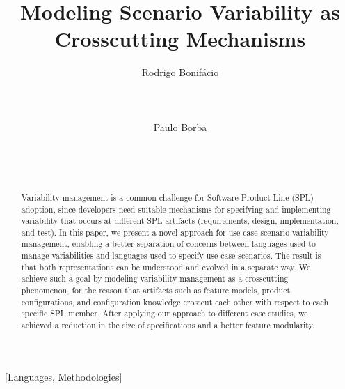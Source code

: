 \documentclass{acm_proc_article-sp}
\begin{document}
\lstset{language=Haskell, numbers=left,
numberstyle=\tiny,numbersep=5pt,basicstyle=\scriptsize,aboveskip=20pt}

\title{Modeling Scenario Variability as Crosscutting Mechanisms}



\author{
\alignauthor
Rodrigo Bonif\'{a}cio\\
       \\
       \\
       \\
\alignauthor
Paulo Borba\\
       \\
       \\
       \\
}

\maketitle

\begin{abstract}
Variability management is a common challenge for Software Product
Line (SPL) adoption, since developers need suitable
mechanisms for specifying and implementing variability
that occurs at different SPL artifacts (requirements, design,
implementation, and test). In this paper, we present a novel approach for
use case scenario variability management, enabling a better
separation of concerns between languages used to manage
variabilities and languages used to specify use case scenarios. The
result is that both representations can be understood and evolved in
a separate way. We achieve such a goal by modeling variability management
as a crosscutting phenomenon, for the reason that artifacts such as feature models,
product configurations, and configuration knowledge crosscut each
other with respect to each specific SPL member. After applying our approach to
different case studies, we achieved a reduction in the size of specifications
and a better feature modularity.
\end{abstract}

[Languages,
Methodologies]\





%
%



\end{document}
